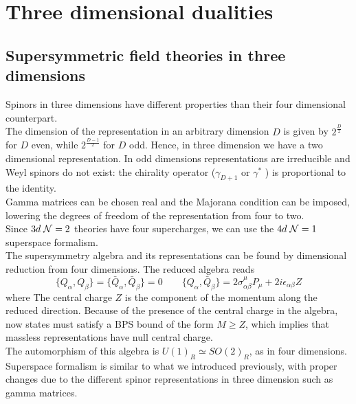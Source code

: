 

\chapter{ \bfseries Three dimensional dualities}
\section[Susy field theories in 3D]{Supersymmetric field theories in three dimensions}
Spinors in three dimensions have different properties than their four dimensional counterpart.\\
The dimension of the representation in an arbitrary dimension $D$  is given by $2^{\frac{D}{2}} $
for $D$ even, while $2^{\frac{D-1}{2}} $ for $D$ odd.
Hence, in three dimension we have a two dimensional representation.
In odd dimensions representations are irreducible and Weyl spinors do not exist: the chirality operator ($\gamma_{D+1}$ or $\gamma^*$ ) is proportional to the identity.
\\
Gamma matrices can be chosen real and the Majorana condition can be imposed, lowering the degrees of freedom of the representation from four to two.\\
Since $3d \; \mathcal{N}=2$ theories have four supercharges, we can use the $4d \; \mathcal{N}=1$ superspace formalism. 
\\
The supersymmetry algebra and its representations can be found by dimensional reduction from four dimensions. 
The reduced algebra reads
\begin{equation}
 \{ Q_{\alpha},Q_{\beta} \} =  \{ \bar{Q}_{\alpha},\bar{Q}_{\beta} \}= 0 \qquad \{ Q_{\alpha} , \bar{Q}_{\beta}   \} = 2 \sigma^{\mu}_{\alpha \beta} P_{\mu} + 2 i \epsilon_{\alpha \beta} Z
 \end{equation} 
 where 
The central charge $Z$ is the component of the momentum  along the reduced direction.
Because of the presence of the central charge in the algebra, now states must satisfy a BPS bound of the form $M \geq Z $, which implies that massless representations have null central charge.
\\
The automorphism of this algebra is $U(1)_R \simeq SO(2)_R$, as in four dimensions.
\\
Superspace formalism is similar to what we introduced previously, with proper changes due to the different spinor representations in three dimension such as gamma matrices.
